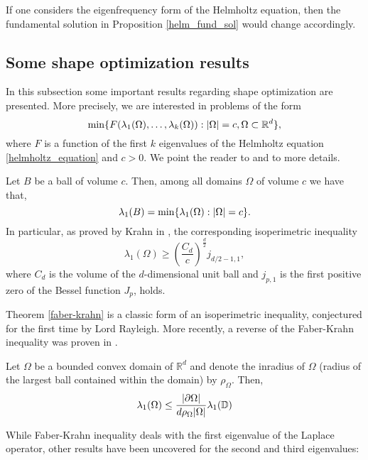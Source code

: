If one considers the eigenfrequency form of the Helmholtz equation, then the fundamental solution in Proposition \eqref{helm_fund_sol} would change accordingly.

\subsection{Some shape optimization results}

In this subsection some important results regarding shape optimization are presented. More precisely, we are interested in problems of the form
\begin{equation}\label{shape_prob}
    \min\{F(\lambda_1(\Omega),\dots, \lambda_k(\Omega)): \abs{\Omega} = c, \Omega \subset \mathbb{R}^d\},
\end{equation}
where \(F\) is a function of the first \(k\) eigenvalues of the Helmholtz equation \eqref{helmholtz_equation} and \(c > 0\). We point the reader to \cite{henrot2006extremum} and \cite{henrot2017shape} to more details.

\begin{theorem}\label{faber-krahn}
    Let \(B\) be a ball of volume \(c\). Then, among all domains \(\Omega\) of volume \(c\) we have that,
    \[
    \lambda_1(B) = \min\{\lambda_1(\Omega): \abs{\Omega} = c\}.
    \]
    In particular, as proved by Krahn in \cite{krahn1926minimaleigenschaften}, the corresponding isoperimetric inequality
    \[
        \lambda_1(\Omega) \geq \left(\frac{C_d}{c}\right)^\frac{d}{2}j_{d/2-1, 1},
    \]
    where \(C_d\) is the volume of the \(d\)-dimensional unit ball and \(j_{p,1}\) is the first positive zero of the Bessel function \(J_p\), holds.
\end{theorem}

Theorem \eqref{faber-krahn} is a classic form of an isoperimetric inequality, conjectured for the first time by Lord Rayleigh. More recently, a reverse of the Faber-Krahn inequality was proven in \cite{freitas2008sharp}.
\begin{theorem}\label{reverse_faber-krahn}
    Let \(\Omega\) be a bounded convex domain of \(\mathbb{R}^d\) and denote the inradius of \(\Omega\) (radius of the largest ball contained within the domain) by \(\rho_\Omega\). Then,
    \[
    \lambda_1(\Omega) \leq \frac{\abs{\partial \Omega}}{d \rho_\Omega \abs{\Omega}} \lambda_1(\mathbb{D})
    \]
\end{theorem}   

While Faber-Krahn inequality deals with the first eigenvalue of the Laplace operator, other results have been uncovered for the second and third eigenvalues:

